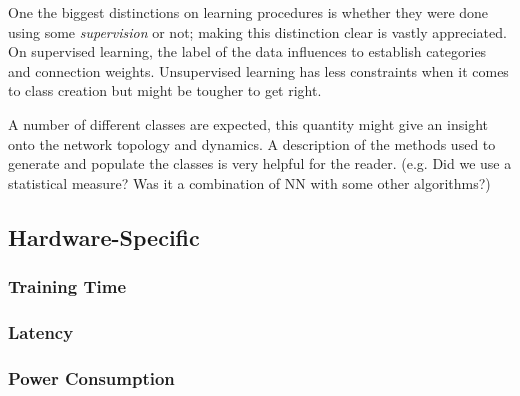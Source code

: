 One the biggest distinctions on learning procedures is whether they were done using some \emph{supervision} or not; making this distinction clear is vastly appreciated. On supervised learning, the label of the data influences to establish categories and connection weights. Unsupervised learning has less constraints when it comes to class creation but might be tougher to get right. 

A number of different classes are expected, this quantity might give an insight onto the network topology and dynamics. A description of the methods used to generate and populate the classes is very helpful for the reader. (e.g. Did we use a statistical measure? Was it a combination of NN with some other algorithms?)


\subsection{Hardware-Specific}
	\subsubsection{Training Time}
	\subsubsection{Latency}
	\subsubsection{Power Consumption}
	
